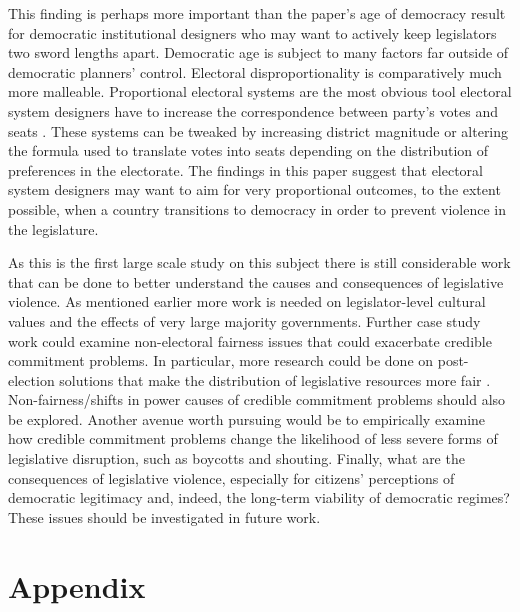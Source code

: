 \documentclass[a4paper]{article}\usepackage[]{graphicx}\usepackage[]{color}
\begin{document}
This finding is perhaps more important than the paper's age of democracy result for democratic institutional designers who may want to actively keep legislators two sword lengths apart. Democratic age is subject to many factors far outside of democratic planners' control. Electoral disproportionality is comparatively much more malleable. Proportional electoral systems are the most obvious tool electoral system designers have to increase the correspondence between party's votes and seats \citep{Carey2011}. These systems can be tweaked by increasing district magnitude or altering the formula used to translate votes into seats depending on the distribution of preferences in the electorate. The findings in this paper suggest that electoral system designers may want to aim for very proportional outcomes, to the extent possible, when a country transitions to democracy in order to prevent violence in the legislature. 

As this is the first large scale study on this subject there is still considerable work that can be done to better understand the causes and consequences of legislative violence. As mentioned earlier more work is needed on legislator-level cultural values and the effects of very large majority governments. Further case study work could examine non-electoral fairness issues that could exacerbate credible commitment problems. In particular, more research could be done on post-election solutions that make the distribution of legislative resources more fair \cite[for example see][who examined informal minority party access to power in Japan's Diet]{Wolfe2004}. Non-fairness/shifts in power causes of credible commitment problems should also be explored. Another avenue worth pursuing would be to empirically examine how credible commitment problems change the likelihood of less severe forms of legislative disruption, such as boycotts and shouting. Finally, what are the consequences of legislative violence, especially for citizens' perceptions of democratic legitimacy and, indeed, the long-term viability of democratic regimes? These issues should be investigated in future work. 





\theendnotes


\clearpage
\section*{Appendix}
\end{document}
